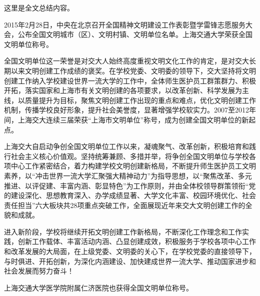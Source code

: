 
\begin{summary}

这里是全文总结内容。

2015年2月28日，中央在北京召开全国精神文明建设工作表彰暨学雷锋志愿服务大会，公布全国文明城市（区）、文明村镇、文明单位名单。上海交通大学荣获全国文明单位称号。         

全国文明单位这一荣誉是对交大人始终高度重视文明文化工作的肯定，是对交大长期以来文明创建工作成绩的褒奖。在学校党委、文明委的领导下，交大坚持将文明创建工作纳入学校建设世界一流大学的工作中，全体师生医护员工群策群力、积极开拓，落实国家和上海市有关文明创建的各项要求，以改革创新、科学发展为主线，以质量提升为目标，聚焦文明创建工作出现的重点和难点，优化文明创建工作机制，传播学校良好形象，提升社会美誉度，显著增强学校软实力。2007至2012年间，上海交大连续三届荣获“上海市文明单位”称号，成为创建全国文明单位的新起点。         

上海交大自启动争创全国文明单位工作以来，凝魂聚气、改革创新，积极培育和践行社会主义核心价值观。坚持统筹兼顾、多措并举，将争创全国文明单位与学校各项中心工作紧密结合，着力构建学校文明创建新格局，不断提升师生医护员工文明素养，以“冲击世界一流大学汇聚强大精神动力”为指导思想，以“聚焦改革、多元推进、以评促建、丰富内涵、彰显特色”为工作原则，并由全体校领导群策领衔“党的建设深化、思想教育深入、办学成绩显著、大学文化丰富、校园环境优化、社会责任担当”六大板块共28项重点突破工作，全面展现近年来交大文明创建工作的全貌和成就。         

进入新阶段，学校将继续开拓文明创建工作新格局，不断深化工作理念和工作实践，创新工作载体、丰富活动内涵、凸显创建成效，积极服务于学校各项中心工作和改革发展的大局面，在上级党委、文明委的关心下，在学校党委的直接领导下，与时俱进、开拓创新，为深化内涵建设、加快建成世界一流大学、推动国家进步和社会发展而努力奋斗！       

上海交通大学医学院附属仁济医院也获得全国文明单位称号。      

\end{summary}
